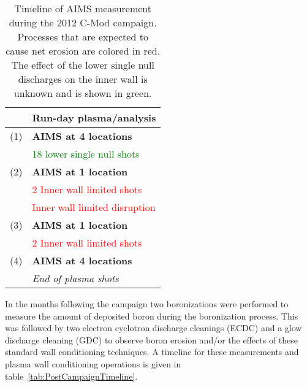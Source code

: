 \documentclass[final,3p,times,twocolumn]{elsarticle}
\begin{document}
%
\begin{table}
 \centering
 \begin{tabular}{ll}
  \hline
  & Run-day plasma/analysis \\ \hline \hline 
  (1)&\textbf{AIMS at 4 locations} \\
  &\textcolor{green}{18 lower single null shots}  \\
  (2)&\textbf{AIMS at 1 location} \\
  &\textcolor{red}{2 Inner wall limited shots} \\
  &\textcolor{red}{Inner wall limited disruption}\\
  (3)&\textbf{AIMS at 1 location} \\
  &\textcolor{red}{2 Inner wall limited shots} \\
  (4)&\textbf{AIMS at 4 locations} \\
  &\textit{End of plasma shots} \\ \hline
 \end{tabular}
  \caption{Timeline of AIMS measurement during the 2012 C-Mod campaign.  Processes that are expected to cause net erosion are colored in red. The effect of the lower single null discharges on the inner wall is unknown and is shown in green.}  
  \label{tab:CampaignTimeline}
\end{table}
  
In the months following the campaign two boronizations were performed to measure the amount of deposited boron during the boronization process. This was followed by two electron cyclotron discharge cleanings (ECDC) and a glow discharge cleaning (GDC) to observe boron erosion and/or the effects of these standard wall conditioning techniques. A timeline for these measurements and plasma wall conditioning operations is given in table~\ref{tab:PostCampaignTimeline}. 
\end{document}
